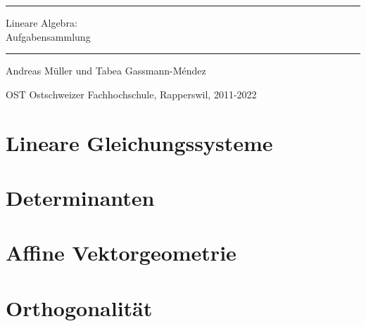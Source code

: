 \documentclass[a4paper,12pt]{book}
\begin{document}
\pagestyle{fancy}
\rhead{}
\frontmatter
\newcommand\HRule{\noindent\rule{\linewidth}{1.5pt}}
\begin{titlepage}
\HRule
\vspace*{2pt}
\begin{flushright}
{\Huge
Lineare Algebra:\\
\bigskip
Aufgabensammlung}
\end{flushright}
\HRule
\begin{flushright}
\vspace{30pt}
\LARGE
Andreas Müller
und
Tabea Gassmann-Méndez
\end{flushright}
\begin{center}
OST Ostschweizer Fachhochschule, Rapperswil, 2011-2022
\end{center}
\end{titlepage}
\tableofcontents
\newenvironment{beispiel}[1][Beispiel]{%
\begin{proof}[#1]%
\renewcommand{\qedsymbol}{$\bigcirc$}
}{\end{proof}}
\mainmatter
\makeatletter
\newcommand{\customlabel}[2]{%
\protected@write \@auxout {}{\string \newlabel {#1}{{#2}{}{}{}{}}}}
\makeatother

\def\gaussurl#1{
\edef\glnumber{\getrefnumber{#1}}
\url{https://linalg.ch/gauss/?id=\glnumber}}
\def\jacobiurl#1{
\edef\glnumber{\getrefnumber{#1}}
\url{https://linalg.ch/jacobi/?id=\glnumber}}
%


\openthemaindex
{}
\allowdisplaybreaks
\chapter{Lineare Gleichungssysteme}

\chapter{Determinanten}

\chapter{Affine Vektorgeometrie}

\chapter{Orthogonalität}

\end{document}
